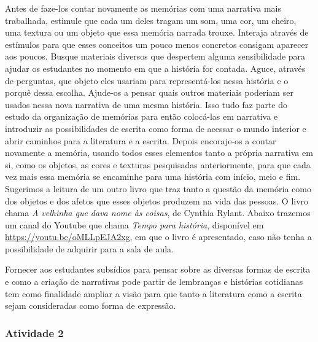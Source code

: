 \documentclass[11pt]{extarticle}
\begin{document}
Antes de faze-los contar novamente as memórias com uma narrativa mais trabalhada, estimule que cada um deles tragam um som, uma cor, um cheiro, uma textura ou um objeto que essa memória narrada trouxe. Interaja através de estímulos para que esses conceitos um pouco menos concretos consigam aparecer aos poucos. Busque materiais diversos que despertem alguma sensibilidade para ajudar os estudantes no momento em que a história for contada. Aguce, através de perguntas, que objeto eles usariam para representá-los nessa história e o porquê dessa escolha. Ajude-os a pensar quais outros materiais poderiam ser usados nessa nova narrativa de uma mesma história. Isso tudo faz parte do estudo da organização de memórias para então colocá-las em narrativa e introduzir as possibilidades de escrita como forma de acessar o mundo interior e abrir caminhos para a literatura e a escrita. Depois encoraje-os a contar novamente a memória, usando todos esses elementos tanto a própria narrativa em si, como os objetos, as cores e texturas pesquisadas anteriormente, para que cada vez mais essa memória se encaminhe para uma história com início, meio e fim. Sugerimos a leitura de um outro livro que traz tanto a questão da memória como dos objetos e dos afetos que esses objetos produzem na vida das pessoas. O livro chama \textit{A velhinha que dava nome às coisas}, de Cynthia Rylant. Abaixo trazemos um canal do Youtube que chama \textit{Tempo para história}, disponível em \url{https://youtu.be/oMLLpEJA2xg}, em que o livro é apresentado, caso não tenha a possibilidade de adquirir para a sala de aula. 


Fornecer aos estudantes subsídios para pensar sobre as diversas formas de escrita e como a criação de narrativas pode partir de lembranças e histórias cotidianas tem como finalidade ampliar a visão para que tanto a literatura como a escrita sejam consideradas como forma de expressão.

\subsubsection{Atividade 2}

\end{document}
